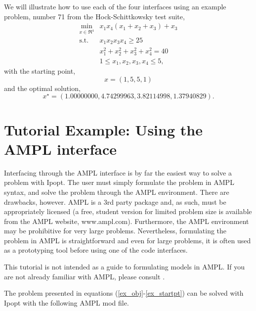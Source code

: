 \documentclass[letter,10pt]{article}
\begin{document}
We will illustrate how to use each of the four interfaces using an
example problem, number 71 from the Hock-Schittkowsky test suite,
\begin{eqnarray}
\min_{x \in \Re^4} &x_1 x_4 (x_1 + x_2 + x_3)  +  x_3 \label{ex_obj} \\
\mbox{s.t.} \;  &x_1 x_2 x_3 x_4 \ge 25 \label{ex_ineq} \\
                &x_1^2 + x_2^2 + x_3^2 + x_4^2  =  40 \label{ex_equ} \\
                &1 \leq x_1, x_2, x_3, x_4 \leq 5, \label{ex_bounds}
\end{eqnarray}
with the starting point,
\begin{equation}
x {=} (1, 5, 5, 1) \label{ex_startpt}
\end{equation}
and the optimal solution,
\[
x^\star {=} (1.00000000, 4.74299963, 3.82114998, 1.37940829). \nonumber
\]

\section{Tutorial Example: Using the AMPL interface}
Interfacing through the AMPL interface is by far the easiest way to
solve a problem with Ipopt. The user must simply formulate the problem
in AMPL syntax, and solve the problem through the AMPL environment.
There are drawbacks, however. AMPL is a 3rd party package and, as
such, must be appropriately licensed (a free, student version for
limited problem size is available from the AMPL website,
www.ampl.com). Furthermore, the AMPL environment may be prohibitive
for very large problems. Nevertheless, formulating the problem in AMPL
is straightforward and even for large problems, it is often used as a
prototyping tool before using one of the code interfaces.

This tutorial is not intended as a guide to formulating models in
AMPL. If you are not already familiar with AMPL, please consult
\cite{AMPL_REFERENCE}.

The problem presented in equations (\ref{ex_obj}-\ref{ex_startpt}) can
be solved with Ipopt with the following AMPL mod file.
\end{document}
